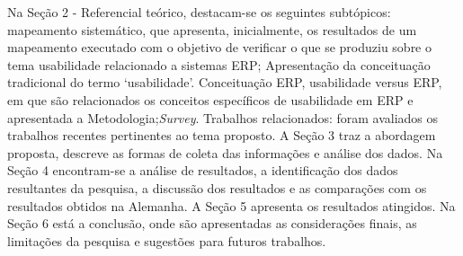 Na Seção 2 - Referencial teórico, destacam-se os seguintes subtópicos: mapeamento sistemático, que apresenta, inicialmente, os resultados de um mapeamento executado com o objetivo de verificar o que se produziu sobre o tema usabilidade relacionado a sistemas ERP;\newline
\indent Apresentação da conceituação tradicional do termo ‘usabilidade’.\newline
\indent Conceituação ERP, usabilidade versus ERP, em que são relacionados os conceitos específicos de usabilidade em ERP e apresentada a Metodologia;\textit{Survey}.\newline
\indent Trabalhos relacionados: foram avaliados os trabalhos recentes pertinentes ao tema proposto.\newline
\indent A Seção 3 traz a abordagem proposta, descreve as formas de coleta das informações e análise dos dados.\newline
\indent Na Seção 4 encontram-se a análise de resultados, a identificação dos dados resultantes da pesquisa, a discussão dos resultados e as comparações com os resultados obtidos na Alemanha.\newline
\indent A Seção 5 apresenta os resultados atingidos.\newline
\indent Na Seção 6 está a conclusão, onde são apresentadas as considerações finais, as limitações da pesquisa e sugestões para futuros trabalhos.
